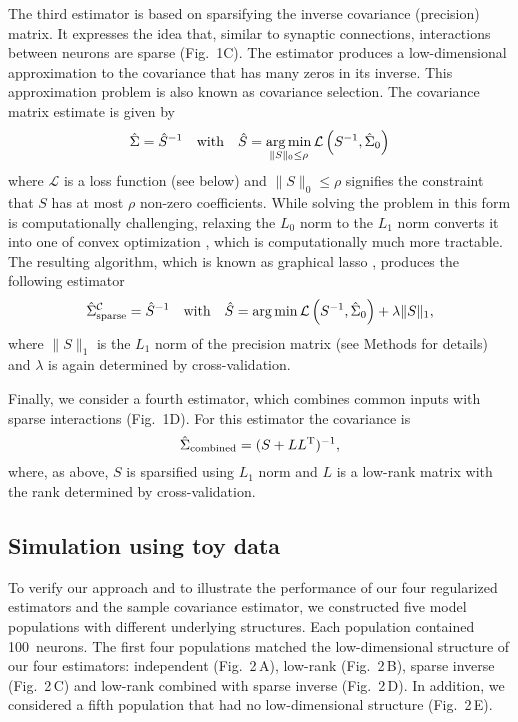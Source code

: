 The third estimator is based on sparsifying the inverse covariance (precision) matrix. It expresses the idea that, similar to synaptic connections, interactions between neurons are sparse (Fig.~1C). The estimator produces a low-dimensional approximation to the covariance that has many zeros in its inverse. This approximation problem is also known as covariance selection. The covariance matrix estimate is given by
\begin{equation}
\hat\Sigma = \hat S^{-1}
\quad\mbox{with}\quad
\hat S = \operatorname*{arg\,min}\limits_{\|S\|_0 \le \rho} \mathcal L\left(S^{-1},\hat\Sigma_0\right)   
\end{equation}
where $\mathcal L$ is a loss function (see below) and $\|S\|_0\le\rho$ signifies the constraint that $S$ has at most $\rho$ non-zero coefficients. While solving the problem in this form is computationally challenging, relaxing the $L_0$ norm to the $L_1$ norm converts it into one of convex optimization \cite{Donoho:2000}, which is computationally much more tractable. The resulting algorithm, which is known as graphical lasso \cite{Meinshausen:2006,Yuan:2007,Banerjee:2008,Friedman:2008}, produces the following estimator  
\begin{equation}
\hat\Sigma_{\rm sparse}^\mathcal{C} = \hat S^{-1}
\quad\mbox{with}\quad
\hat S = \operatorname*{arg\,min} \mathcal L\left(S^{-1},\hat\Sigma_0\right) + \lambda \|S\|_1,
\end{equation}
where $\|S\|_1$ is the $L_1$ norm of the precision matrix (see Methods for details) and $\lambda$ is again determined by cross-validation.

Finally, we consider a fourth estimator, which combines common inputs with sparse interactions (Fig.~1D). For this estimator the covariance is
\begin{equation}
\hat\Sigma_{\rm combined} = (S + LL^{\rm T})^{-1},
\end{equation}
where, as above, $S$ is sparsified using $L_1$ norm and $L$ is a low-rank matrix with the rank determined by cross-validation.



\subsection*{Simulation using toy data}

To verify our approach and to illustrate the performance of our four regularized estimators and the sample covariance estimator, we constructed five model populations with different underlying structures. Each population contained 100~neurons. The first four populations matched the low-dimensional structure of our four estimators: independent (Fig.~2\,A), low-rank (Fig.~2\,B), sparse inverse (Fig.~2\,C) and low-rank combined with sparse inverse (Fig.~2\,D).  In addition, we considered a fifth population that had no low-dimensional structure (Fig.~2\,E).


